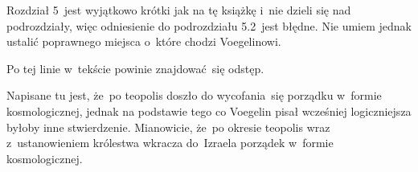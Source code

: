 \documentclass[a4paper,11pt]{article}
\begin{document}
\noindent
{} Rozdział 5~jest wyjątkowo krótki jak na tę
książkę i~nie dzieli się nad podrozdziały, więc odniesienie do
podrozdziału 5.2~jest błędne. Nie umiem jednak ustalić poprawnego
miejsca o~które chodzi Voegelinowi.

\vspace{\spaceFour}





\noindent
{} Po tej linie w~tekście powinie znajdować~się odstęp.

\vspace{\spaceFour}





\noindent
{} Napisane tu jest, że~po teopolis doszło do
wycofania~się porządku w~formie kosmologicznej, jednak na podstawie
tego co Voegelin pisał wcześniej logiczniejsza byłoby inne
stwierdzenie. Mianowicie, że~po okresie teopolis wraz z~ustanowieniem
królestwa wkracza do~Izraela porządek w~formie kosmologicznej.





\newpage

\end{document}
